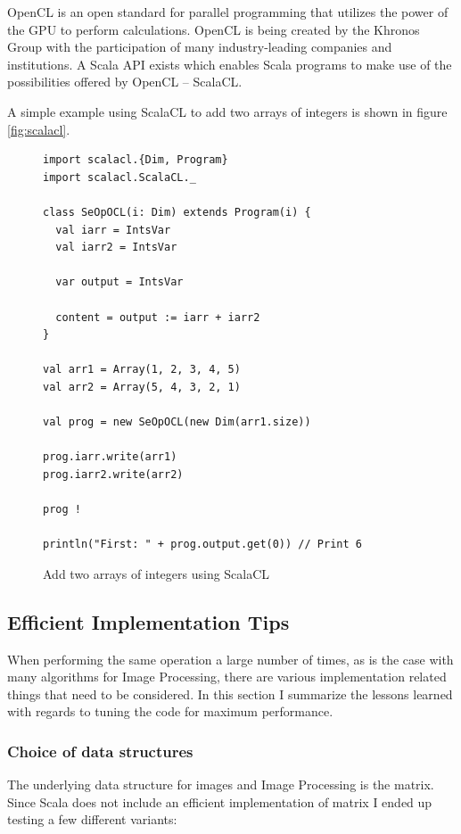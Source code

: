 \documentclass[a4paper,english]{report}
\begin{document}
OpenCL\texttrademark\cite{opencl} is an open standard for parallel
programming that utilizes the power of the GPU to perform
calculations. OpenCL is being created by the Khronos Group with the
participation of many industry-leading companies and institutions. A
Scala API exists which enables Scala programs to make use of the
possibilities offered by OpenCL -- ScalaCL\cite{scalacl}.

A simple example using ScalaCL to add two arrays of integers is shown
in figure \vref{fig:scalacl}.

\begin{figure}
  \begin{lstlisting}
import scalacl.{Dim, Program}
import scalacl.ScalaCL._

class SeOpOCL(i: Dim) extends Program(i) {
  val iarr = IntsVar
  val iarr2 = IntsVar
  
  var output = IntsVar
  
  content = output := iarr + iarr2
}

val arr1 = Array(1, 2, 3, 4, 5)
val arr2 = Array(5, 4, 3, 2, 1)

val prog = new SeOpOCL(new Dim(arr1.size))

prog.iarr.write(arr1)
prog.iarr2.write(arr2)

prog !

println("First: " + prog.output.get(0)) // Print 6
  \end{lstlisting}
  \caption{Add two arrays of integers using
    ScalaCL\label{fig:scalacl}}
\end{figure}

\subsection{Efficient Implementation Tips}
\label{sec:effimpl}

When performing the same operation a large number of times, as is the
case with many algorithms for Image Processing, there are various
implementation related things that need to be considered. In this
section I summarize the lessons learned with regards to tuning the
code for maximum performance.

\subsubsection{Choice of data structures}
\label{sec:datastructures}

The underlying data structure for images and Image Processing is the
matrix. Since Scala does not include an efficient implementation of
matrix I ended up testing a few different variants:
\end{document}
